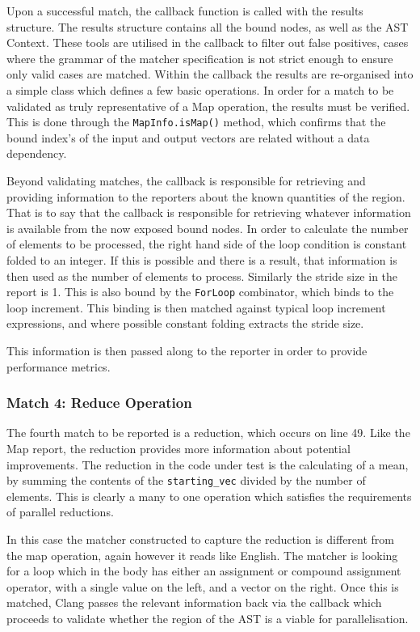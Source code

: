 Upon a successful match, the callback function is called with the results structure. The results
structure contains all the bound nodes, as well as the AST Context. These tools are utilised in the
callback to filter out false positives, cases where the grammar of the matcher specification is not
strict enough to ensure only valid cases are matched. Within the callback the results are
re-organised into a simple class which defines a few basic operations. In order for a match to be
validated as truly representative of a Map operation, the results must be verified. This is done
through the \lstinline{MapInfo.isMap()} method, which confirms that the bound index's of the input
and output vectors are related without a data dependency.

Beyond validating matches, the callback is responsible for retrieving and providing information to
the reporters about the known quantities of the region. That is to say that the callback is
responsible for retrieving whatever information is available from the now exposed bound nodes.  In
order to calculate the number of elements to be processed, the right hand side of the loop condition
is constant folded to an integer. If this is possible and there is a result, that information is
then used as the number of elements to process. Similarly the stride size in the report is 1. This
is also bound by the \lstinline{ForLoop} combinator, which binds to the loop increment. This binding
is then matched against typical loop increment expressions, and where possible constant folding
extracts the stride size.

This information is then passed along to the reporter in order to provide performance metrics.

\subsubsection{Match 4: Reduce Operation}
The fourth match to be reported is a reduction, which occurs on line 49. Like the Map report, the
reduction provides more information about potential improvements. The reduction in the code under
test is the calculating of a mean, by summing the contents of the \lstinline{starting_vec} divided
by the number of elements. This is clearly a many to one operation which satisfies the requirements
of parallel reductions. 

In this case the matcher constructed to capture the reduction is different from the map operation,
again however it reads like English. The matcher is looking for a loop which in the body has either
an assignment or compound assignment operator, with a single value on the left, and a vector on the
right. Once this is matched, Clang passes the relevant information back via the callback which
proceeds to validate whether the region of the AST is a viable for parallelisation.

